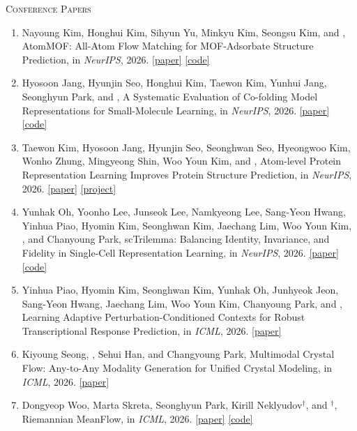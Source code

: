 \vspace{0.5\baselineskip}
\textsc{Conference Papers}
\begin{enumerate}
\item Nayoung Kim, Honghui Kim, Sihyun Yu, Minkyu Kim, Seongsu Kim, and , AtomMOF: All-Atom Flow Matching for MOF-Adsorbate Structure Prediction, in \textit{NeurIPS}, 2026. \mbox{\href{https://arxiv.org/abs/2602.07351}{[paper]}} \mbox{\href{https://github.com/nayoung10/AtomMOF}{[code]}}
\item Hyosoon Jang, Hyunjin Seo, Honghui Kim, Taewon Kim, Yunhui Jang, Seonghyun Park, and , A Systematic Evaluation of Co-folding Model Representations for Small-Molecule Learning, in \textit{NeurIPS}, 2026. \mbox{\href{https://arxiv.org/abs/2602.13249}{[paper]}} \mbox{\href{https://github.com/hsjang0/boltz-as-FM}{[code]}}
\item Taewon Kim, Hyosoon Jang, Hyunjin Seo, Seonghwan Seo, Hyeongwoo Kim, Wonho Zhung, Mingyeong Shin, Woo Youn Kim, and , Atom-level Protein Representation Learning Improves Protein Structure Prediction, in \textit{NeurIPS}, 2026. \mbox{\href{https://arxiv.org/abs/2605.22133}{[paper]}} \mbox{\href{https://holymollyhao.github.io/TriProRep/}{[project]}}
\item Yunhak Oh, Yoonho Lee, Junseok Lee, Namkyeong Lee, Sang-Yeon Hwang, Yinhua Piao, Hyomin Kim, Seonghwan Kim, Jaechang Lim, Woo Youn Kim, , and Chanyoung Park, scTrilemma: Balancing Identity, Invariance, and Fidelity in Single-Cell Representation Learning, in \textit{NeurIPS}, 2026. \mbox{\href{https://arxiv.org/abs/2609.38840}{[paper]}} \mbox{\href{https://github.com/yunhak0/scTrilemma}{[code]}}
\item Yinhua Piao, Hyomin Kim, Seonghwan Kim, Yunhak Oh, Junhyeok Jeon, Sang-Yeon Hwang, Jaechang Lim, Woo Youn Kim, Chanyoung Park, and , Learning Adaptive Perturbation-Conditioned Contexts for Robust Transcriptional Response Prediction, in \textit{ICML}, 2026. \mbox{\href{https://arxiv.org/abs/2602.18885}{[paper]}}
\item Kiyoung Seong, , Sehui Han, and Changyoung Park, Multimodal Crystal Flow: Any-to-Any Modality Generation for Unified Crystal Modeling, in \textit{ICML}, 2026. \mbox{\href{https://arxiv.org/abs/2602.20210}{[paper]}}
\item Dongyeop Woo, Marta Skreta, Seonghyun Park, Kirill Neklyudov$^\dagger$, and $^\dagger$, Riemannian MeanFlow, in \textit{ICML}, 2026. \mbox{\href{https://arxiv.org/abs/2602.07744}{[paper]}} \mbox{\href{https://github.com/dongyeop3813/Riemannian-MeanFlow}{[code]}}

\end{enumerate}

